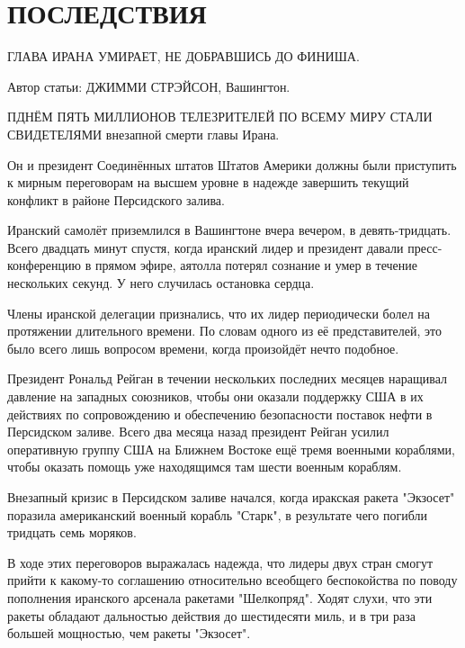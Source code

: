 \documentclass[a4paper,12pt]{book}
\begin{document}
\chapter{ПОСЛЕДСТВИЯ}
\begin{center}
ГЛАВА ИРАНА УМИРАЕТ, НЕ ДОБРАВШИСЬ ДО ФИНИША.\\
\end{center}
\par
\begin{center}
Автор статьи: ДЖИММИ СТРЭЙСОН, Вашингтон.\\
\end{center}
\par
П{ ДНЁМ ПЯТЬ МИЛЛИОНОВ ТЕЛЕЗРИТЕЛЕЙ ПО ВСЕМУ МИРУ СТАЛИ СВИДЕТЕЛЯМИ} внезапной смерти главы Ирана.
\par
Он и президент Соединённых штатов Штатов Америки должны были приступить к мирным переговорам на высшем уровне в надежде завершить текущий конфликт в районе Персидского залива.\\
\par
Иранский самолёт приземлился в Вашингтоне вчера вечером, в девять-тридцать. Всего двадцать минут спустя, когда иранский лидер и президент давали пресс-конференцию в прямом эфире, аятолла потерял сознание и умер в течение нескольких секунд. У него случилась остановка сердца.\\
\par
Члены иранской делегации признались, что их лидер периодически болел на протяжении длительного времени. По словам одного из её представителей, это было всего лишь вопросом времени, когда произойдёт нечто подобное.\\
\par
Президент Рональд Рейган в течении нескольких последних месяцев наращивал давление на западных союзников, чтобы они оказали поддержку США в их действиях по сопровождению и обеспечению безопасности поставок нефти в Персидском заливе. Всего два месяца назад президент Рейган усилил оперативную группу США на Ближнем Востоке ещё тремя военными кораблями, чтобы оказать помощь уже находящимся там шести военным кораблям.\\
\par
Внезапный кризис в Персидском заливе начался, когда иракская ракета "Экзосет" поразила американский военный корабль "Старк", в результате чего погибли тридцать семь моряков.\\
\par
В ходе этих переговоров выражалась надежда, что лидеры двух стран смогут прийти к какому-то соглашению относительно всеобщего беспокойства по поводу пополнения иранского арсенала ракетами "Шелкопряд". Ходят слухи, что эти ракеты обладают дальностью действия до шестидесяти миль, и в три раза большей мощностью, чем ракеты "Экзосет".\\
\end{document}
